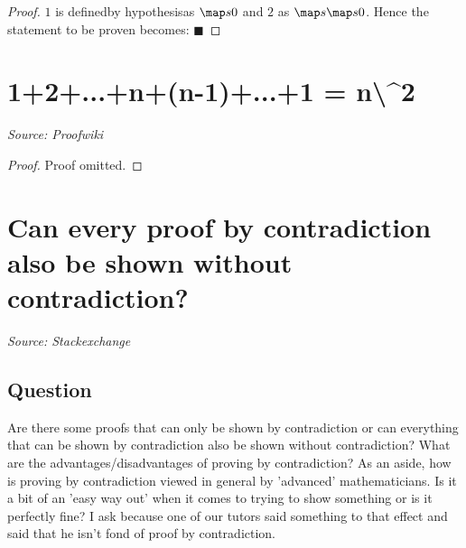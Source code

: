 \documentclass{article}
\begin{document}
\begin{proof}
$1$ is definedby hypothesisas $\map s 0$ and $2$ as $\map s {\map s 0}$. Hence the statement to be proven becomes: $\blacksquare$
\end{proof}

\newpage

\section{1+2+...+n+(n-1)+...+1 = n\textbackslash{}^{}2}
\textit{Source: Proofwiki}

\begin{proof}
Proof omitted.
\end{proof}

\newpage

\section{Can every proof by contradiction also be shown without contradiction?}
\textit{Source: Stackexchange}

\subsection*{Question}
Are there some proofs that can only be shown by contradiction or can everything that can be shown by contradiction also be shown without contradiction? What are the advantages/disadvantages of proving by contradiction? As an aside, how is proving by contradiction viewed in general by 'advanced' mathematicians. Is it a bit of an 'easy way out' when it comes to trying to show something or is it perfectly fine? I ask because one of our tutors said something to that effect and said that he isn't fond of proof by contradiction.
\end{document}
